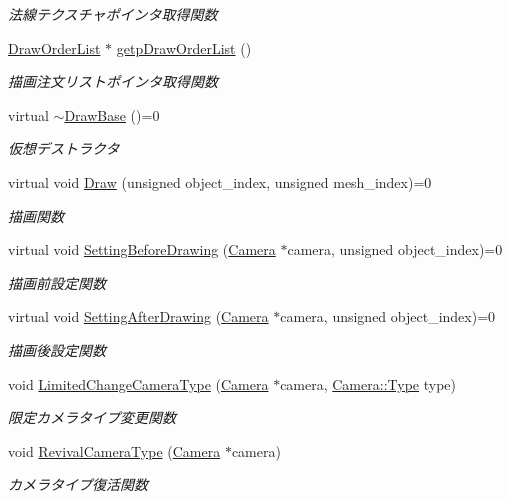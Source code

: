 \begin{DoxyCompactItemize}
\begin{DoxyCompactList}\small\item\em 法線テクスチャポインタ取得関数 \end{DoxyCompactList}\item 
\mbox{\hyperlink{class_draw_order_list}{Draw\+Order\+List}} $\ast$ \mbox{\hyperlink{class_draw_base_af5fe522d4bbce381e6fe8e5601b69e9f}{getp\+Draw\+Order\+List}} ()
\begin{DoxyCompactList}\small\item\em 描画注文リストポインタ取得関数 \end{DoxyCompactList}\item 
virtual \mbox{\hyperlink{class_draw_base_af276fa23e7c5f51a4fdeab016456a992}{$\sim$\+Draw\+Base}} ()=0
\begin{DoxyCompactList}\small\item\em 仮想デストラクタ \end{DoxyCompactList}\item 
virtual void \mbox{\hyperlink{class_draw_base_a408080106630a1146d7af0bb46a4d8d1}{Draw}} (unsigned object\+\_\+index, unsigned mesh\+\_\+index)=0
\begin{DoxyCompactList}\small\item\em 描画関数 \end{DoxyCompactList}\item 
virtual void \mbox{\hyperlink{class_draw_base_a3978252914ddde12197ea4577356bf25}{Setting\+Before\+Drawing}} (\mbox{\hyperlink{class_camera}{Camera}} $\ast$camera, unsigned object\+\_\+index)=0
\begin{DoxyCompactList}\small\item\em 描画前設定関数 \end{DoxyCompactList}\item 
virtual void \mbox{\hyperlink{class_draw_base_afe64f27b0bbf8c45da7aa0de4c3f3d65}{Setting\+After\+Drawing}} (\mbox{\hyperlink{class_camera}{Camera}} $\ast$camera, unsigned object\+\_\+index)=0
\begin{DoxyCompactList}\small\item\em 描画後設定関数 \end{DoxyCompactList}\item 
void \mbox{\hyperlink{class_draw_base_aa18abd488181eed72822f92a0f2521fe}{Limited\+Change\+Camera\+Type}} (\mbox{\hyperlink{class_camera}{Camera}} $\ast$camera, \mbox{\hyperlink{class_camera_a3b0a1f58deca679ac665f61c480d1dcb}{Camera\+::\+Type}} type)
\begin{DoxyCompactList}\small\item\em 限定カメラタイプ変更関数 \end{DoxyCompactList}\item 
void \mbox{\hyperlink{class_draw_base_a48b144e61928b7658c7a849017e40c79}{Revival\+Camera\+Type}} (\mbox{\hyperlink{class_camera}{Camera}} $\ast$camera)
\begin{DoxyCompactList}\small\item\em カメラタイプ復活関数 \end{DoxyCompactList}\end{DoxyCompactItemize}
